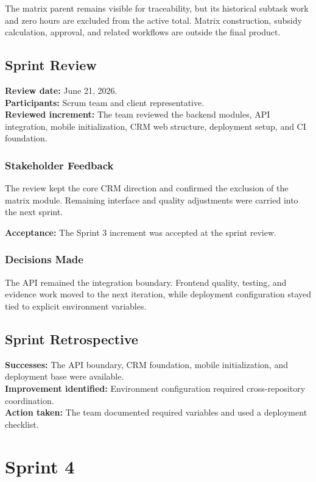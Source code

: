 \documentclass[letterpaper%
, oneside%
, 12pt%
, memoireprojet%
, english%
,creativecommons,hyperref, withAlgo2e %
]{thETS}
\begin{document}
The matrix parent remains visible for traceability, but its historical subtask work and zero hours
are excluded from the active total. Matrix construction, subsidy calculation, approval, and
related workflows are outside the final product.

\subsection{Sprint Review}
\textbf{Review date:} June 21, 2026.\\
\textbf{Participants:} Scrum team and client representative.\\
\textbf{Reviewed increment:} The team reviewed the backend modules, API integration, mobile
initialization, CRM web structure, deployment setup, and CI foundation.

\subsubsection{Stakeholder Feedback}
The review kept the core CRM direction and confirmed the exclusion of the matrix module. Remaining
interface and quality adjustments were carried into the next sprint.

\textbf{Acceptance:} The Sprint 3 increment was accepted at the sprint review.

\subsubsection{Decisions Made}
The API remained the integration boundary. Frontend quality, testing, and evidence work moved to
the next iteration, while deployment configuration stayed tied to explicit environment variables.

\subsection{Sprint Retrospective}
\textbf{Successes:} The API boundary, CRM foundation, mobile initialization, and deployment base were available.\\
\textbf{Improvement identified:} Environment configuration required cross-repository coordination.\\
\textbf{Action taken:} The team documented required variables and used a deployment checklist.

\section{Sprint 4}
\end{document}
